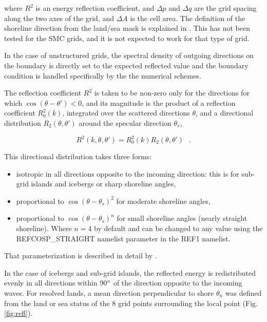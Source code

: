 \noindent
where $R^2$ is an energy reflection coefficient, and $\Delta p$ and $\Delta q$
are the grid spacing along the two axes of the grid, and $\Delta A$ is the
cell area. The definition of the shoreline direction from the land/sea mask is
explained in \cite{art:Aea11}. This has not been tested for the SMC grids, and
it is not expected to work for that type of grid.

In the case of unstructured grids, the spectral density of outgoing directions
on the boundary is directly set to the expected reflected value and the
boundary condition is handled specifically by the the numerical schemes.


The reflection coefficient $R^2$ is taken to be non-zero only for the
directions for which $\cos(\theta-\theta')<0$, and its magnitude is the
product of a reflection coefficient $R_0^2(k)$, integrated over the scattered
directions $\theta$, and a directional distribution $R_2(\theta,\theta')$
around the specular direction $\theta_s$,

\begin{equation} 
R^2(k,\theta,\theta')  =  R_0^2(k) R_2(\theta,\theta') \:\:\: .
\end{equation}

\noindent
This directional distribution takes three forms: 
\begin{itemize}

\item isotropic in all directions opposite to the incoming direction: this is
      for sub-grid islands and icebergs or sharp shoreline angles, 

\item proportional to $\cos(\theta-\theta_s)^2$ for moderate shoreline angles,

\item proportional to $\cos(\theta-\theta_s)^n$ for small shoreline angles
      (nearly straight shoreline). Where $n=4$ by default and can be changed
      to any value using the {\code REFCOSP\_STRAIGHT} namelist parameter in
      the {\code REF1} namelist.

\end{itemize}

\noindent
That parameterization is described in detail by \cite{art:AR12}.

In the case of icebergs and sub-grid islands, the reflected energy is
redistributed evenly in all directions within 90$^\circ$ of the direction
opposite to the incoming waves.  For resolved lands, a mean direction
perpendicular to shore $\theta_n$ was defined from the land or sea status of
the 8 grid points surrounding the local point (Fig. \ref{fig:refl}).

